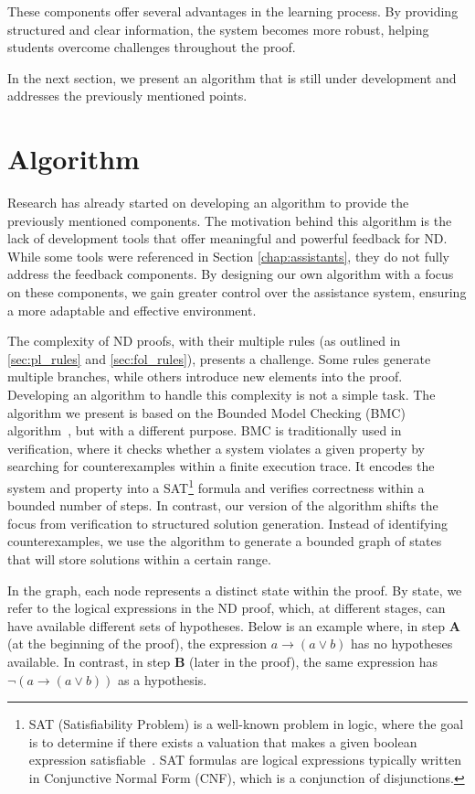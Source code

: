 These components offer several advantages in the learning process. By providing structured and clear information, the system becomes more robust, helping students overcome challenges throughout the proof.

In the next section, we present an algorithm that is still under development and addresses the previously mentioned points.

\section{Algorithm}
Research has already started on developing an algorithm to provide the previously mentioned components. The motivation behind this algorithm is the lack of development tools that offer meaningful and powerful feedback for \gls{ND}. While some tools were referenced in Section \ref{chap:assistants}, they do not fully address the feedback components. By designing our own algorithm with a focus on these components, we gain greater control over the assistance system, ensuring a more adaptable and effective environment.

The complexity of \gls{ND} proofs, with their multiple rules (as outlined in \ref{sec:pl_rules} and \ref{sec:fol_rules}), presents a challenge. Some rules generate multiple branches, while others introduce new elements into the proof. Developing an algorithm to handle this complexity is not a simple task. The algorithm we present is based on the Bounded Model Checking (BMC) algorithm~\cite{biere2021bounded}, but with a different purpose. BMC is traditionally used in verification, where it checks whether a system violates a given property by searching for counterexamples within a finite execution trace. It encodes the system and property into a SAT\footnote{SAT (Satisfiability Problem) is a well-known problem in logic, where the goal is to determine if there exists a valuation that makes a given boolean expression satisfiable~\cite{You2019G2SATLT}. SAT formulas are logical expressions typically written in Conjunctive Normal Form (CNF), which is a conjunction of disjunctions.} formula and verifies correctness within a bounded number of steps. In contrast, our version of the algorithm shifts the focus from verification to structured solution generation. Instead of identifying counterexamples, we use the algorithm to generate a bounded graph of states that will store solutions within a certain range.

In the graph, each node represents a distinct state within the proof. By state, we refer to the logical expressions in the \gls{ND} proof, which, at different stages, can have available different sets of hypotheses. Below is an example where, in step \textbf{A} (at the beginning of the proof), the expression \(a \to (a \lor b)\) has no hypotheses available. In contrast, in step \textbf{B} (later in the proof), the same expression has \(\neg(a \to (a \lor b))\) as a hypothesis.

